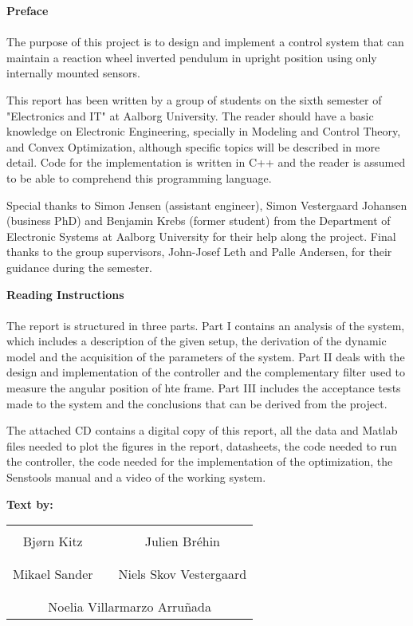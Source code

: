 \textbf{\huge{Preface}}
\\
\\
The purpose of this project is to design and implement a control system that can maintain a reaction wheel inverted pendulum in upright position using only internally mounted sensors.

This report has been written by a group of students on the sixth semester of "Electronics and IT" at Aalborg University.
The reader should have a basic knowledge on Electronic Engineering, specially in Modeling and Control Theory, and Convex Optimization, although specific topics will be described in more detail. Code for the implementation is written in C++ and the reader is assumed to be able to comprehend this programming language. 

Special thanks to Simon Jensen (assistant engineer), Simon Vestergaard Johansen (business PhD) and Benjamin Krebs (former student) from the Department of Electronic Systems at Aalborg University for their help along the project. Final thanks to the group supervisors, John-Josef Leth and Palle Andersen, for their guidance during the semester.

\textbf{Reading Instructions}
\\
\\
The report is structured in three parts. Part I contains an analysis of the system, which includes a description of the given setup, the derivation of the dynamic model and the acquisition of the parameters of the system. Part II deals with the design and implementation of the controller and the complementary filter used to measure the angular position of hte frame. Part III includes the acceptance tests made to the system and the conclusions that can be derived from the project.

The attached CD contains a digital copy of this report, all the data and Matlab files needed to plot the figures in the report, datasheets, the code needed to run the controller, the code needed for the implementation of the optimization, the Senstools manual and a video of the working system.  

\textbf{Text by:}\\
\vspace{-5 pt}
\begin{table}[H]
	\centering
		\begin{tabular}{c c c}
			\underline{\phantom{JAERJAERJAERJAERGO}} & \phantom{cookies} & \underline{\phantom{JAERJAERJAERJAERGO}} \\
			Bjørn Kitz			& \phantom{cookies} & Julien Br\'ehin		\\
			&&\\
			\underline{\phantom{JAERJAERJAERJAERGO}} & \phantom{cookies} & \underline{\phantom{JAERJAERJAERJAERGO}} \\
			Mikael Sander			& \phantom{cookies} & Niels Skov Vestergaard		\\
			&&\\
	    \multicolumn{3}{c}{\underline{\phantom{JAERJAERJAERJAERGO}}}\\
	    \multicolumn{3}{c}{Noelia Villarmarzo Arruñada}\\				
		\end{tabular}
\end{table}

\pagebreak